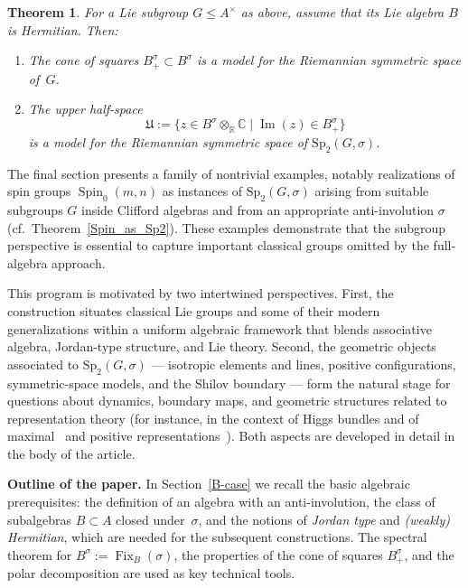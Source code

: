 \documentclass[a4paper,oneside,11pt]{amsart}
\DeclareMathOperator{\Imm}{Im}
\DeclareMathOperator{\Fix}{Fix}
\newcommand{\R}{\mathbb R}
\newcommand{\CC}{\mathbb C}
\theoremstyle{plain}
\newtheorem{teo}{Theorem}[section]
\theoremstyle{definition}
\theoremstyle{remark}
\begin{document}
\begin{teo}
For a Lie subgroup $G\leq A^\times$ as above, assume that its Lie algebra $B$ is Hermitian. Then:
\begin{enumerate}
  \item The \emph{cone of squares} $B^\sigma_+\subset B^\sigma$ is a model for the Riemannian symmetric space of~$G$.
  \item The \emph{upper half-space}
  \[
    \mathfrak U:=\{z\in B^\sigma\otimes_\R\CC \mid \Imm(z)\in B^\sigma_+\}
  \]
  is a model for the Riemannian symmetric space of $\mathrm{Sp}_2(G,\sigma)$.
\end{enumerate}
\end{teo}
The final section presents a family of nontrivial examples, notably realizations of spin groups $\operatorname{Spin}_0(m,n)$ as instances of $\mathrm{Sp}_2(G,\sigma)$ arising from suitable subgroups $G$ inside Clifford algebras and from an appropriate anti-involution $\sigma$ (cf.\ Theorem~\ref{Spin_as_Sp2}). These examples demonstrate that the subgroup perspective is essential to capture important classical groups omitted by the full-algebra approach.

This program is motivated by two intertwined perspectives. First, the construction situates classical Lie groups and some of their modern generalizations within a uniform algebraic framework that blends associative algebra, Jordan-type structure, and Lie theory. Second, the geometric objects associated to $\mathrm{Sp}_2(G,\sigma)$ --- isotropic elements and lines, positive configurations, symmetric-space models, and the Shilov boundary --- form the natural stage for questions about dynamics, boundary maps, and geometric structures related to representation theory (for instance, in the context of Higgs bundles \cite{BGPG,BGPR} and of maximal~\cite{BIW,BILW,AGRW} and positive representations~\cite{GLW,GW2,GRW}). Both aspects are developed in detail in the body of the article.

\vspace{5mm}\noindent\textbf{Outline of the paper.}
In Section~\ref{B-case} we recall the basic algebraic prerequisites: the definition of an algebra with an anti-involution, the class of subalgebras $B\subset A$ closed under~$\sigma$, and the notions of \emph{Jordan type} and \emph{(weakly) Hermitian}, which are needed for the subsequent constructions. The spectral theorem for $B^\sigma:=\Fix_B(\sigma)$, the properties of the cone of squares $B^\sigma_+$, and the polar decomposition are used as key technical tools.
\end{document}
